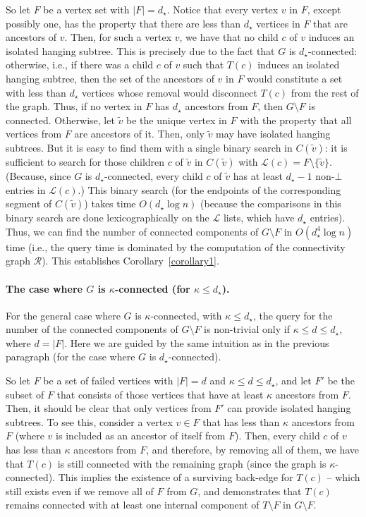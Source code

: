 \documentclass[11pt,a4paper]{article}
\begin{document}
So let $F$ be a vertex set with $|F|=d_{\star}$. Notice that every vertex $v$ in $F$, except possibly one, has the property that there are less than $d_{\star}$ vertices in $F$ that are ancestors of $v$. Then, for such a vertex $v$, we have that no child $c$ of $v$ induces an isolated hanging subtree. This is precisely due to the fact that $G$ is $d_{\star}$-connected: otherwise, i.e., if there was a child $c$ of $v$ such that $T(c)$ induces an isolated hanging subtree, then the set of the ancestors of $v$ in $F$ would constitute a set with less than $d_{\star}$ vertices whose removal would disconnect $T(c)$ from the rest of the graph. Thus, if no vertex in $F$ has $d_{\star}$ ancestors from $F$, then $G\setminus F$ is connected. Otherwise, let $\tilde{v}$ be the unique vertex in $F$ with the property that all vertices from $F$ are ancestors of it. Then, only $\tilde{v}$ may have isolated hanging subtrees. But it is easy to find them with a single binary search in $C(\tilde{v})$: it is sufficient to search for those children $c$ of $\tilde{v}$ in $C(\tilde{v})$ with $\mathcal{L}(c)=F\setminus\{\tilde{v}\}$. (Because, since $G$ is $d_{\star}$-connected, every child $c$ of $\tilde{v}$ has at least $d_{\star}-1$ non-$\bot$ entries in $\mathcal{L}(c)$.) This binary search (for the endpoints of the corresponding segment of $C(\tilde{v})$) takes time $O(d_{\star}\log{n})$ (because the comparisons in this binary search are done lexicographically on the $\mathcal{L}$ lists, which have $d_{\star}$ entries). Thus, we can find the number of connected components of $G\setminus F$ in $O(d_{\star}^4\log{n})$ time (i.e., the query time is dominated by the computation of the connectivity graph $\mathcal{R}$). This establishes Corollary~\ref{corollary1}.

\paragraph{The case where $G$ is $\kappa$-connected (for $\kappa\leq d_{\star}$).}
For the general case where $G$ is $\kappa$-connected, with $\kappa\leq d_{\star}$, the query for the number of the connected components of $G\setminus F$ is non-trivial only if $\kappa\leq d\leq d_{\star}$, where $d=|F|$. Here we are guided by the same intuition as in the previous paragraph (for the case where $G$ is $d_{\star}$-connected).

So let $F$ be a set of failed vertices with $|F|=d$ and $\kappa\leq d\leq d_{\star}$, and let $F'$ be the subset of $F$ that consists of those vertices that have at least $\kappa$ ancestors from $F$. Then, it should be clear that only vertices from $F'$ can provide isolated hanging subtrees. To see this, consider a vertex $v\in F$ that has less than $\kappa$ ancestors from $F$ (where $v$ is included as an ancestor of itself from $F$). Then, every child $c$ of $v$ has less than $\kappa$ ancestors from $F$, and therefore, by removing all of them, we have that $T(c)$ is still connected with the remaining graph (since the graph is $\kappa$-connected). This implies the existence of a surviving back-edge for $T(c)$ -- which still exists even if we remove all of $F$ from $G$, and demonstrates that $T(c)$ remains connected with at least one internal component of $T\setminus F$ in $G\setminus F$.
\end{document}
